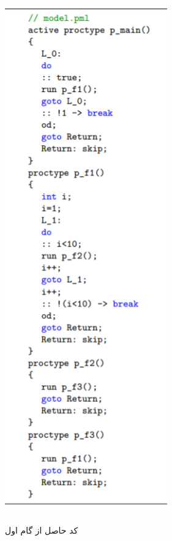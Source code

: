  \begin{figure}
	\centering
	\includegraphics[height=23cm,width=7cm]{h.png}
	\caption{کد حاصل از گام اول}
	\centering
\end{figure}


